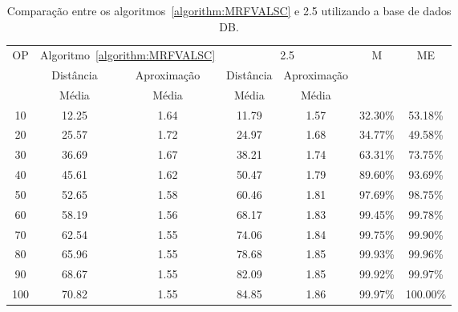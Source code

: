 \begin{table}[!htb]
  \caption{Comparação entre os algoritmos~\ref{algorithm:MRFVALSC} e 2.5\SbIRT{} utilizando a base de dados DB\textsubscript{\SbIRTM}.}
  \label{table:CFCQOBJI}
  \centering
  \begin{tabular}{|c|c|c|c|c|c|c|}
  \hline
          \multirow{3}{*}{OP} & \multicolumn{2}{c|}{Algoritmo~\ref{algorithm:MRFVALSC}} &  \multicolumn{2}{c|}{2.5\SbIRTM{}}  & \multirow{3}{*}{M} & \multirow{3}{*}{ME} \\ \cline{2-5}
                              &                     Distância &             Aproximação & Distância &             Aproximação &                    &                     \\
                              &                         Média &                   Média &     Média &                   Média &                    &                     \\ \hline
  10                          &                         12.25 &                    1.64 &     11.79 &                    1.57 &            32.30\% &             53.18\% \\ \hline
  20                          &                         25.57 &                    1.72 &     24.97 &                    1.68 &            34.77\% &             49.58\% \\ \hline
  30                          &                         36.69 &                    1.67 &     38.21 &                    1.74 &            63.31\% &             73.75\% \\ \hline
  40                          &                         45.61 &                    1.62 &     50.47 &                    1.79 &            89.60\% &             93.69\% \\ \hline
  50                          &                         52.65 &                    1.58 &     60.46 &                    1.81 &            97.69\% &             98.75\% \\ \hline
  60                          &                         58.19 &                    1.56 &     68.17 &                    1.83 &            99.45\% &             99.78\% \\ \hline
  70                          &                         62.54 &                    1.55 &     74.06 &                    1.84 &            99.75\% &             99.90\% \\ \hline
  80                          &                         65.96 &                    1.55 &     78.68 &                    1.85 &            99.93\% &             99.96\% \\ \hline
  90                          &                         68.67 &                    1.55 &     82.09 &                    1.85 &            99.92\% &             99.97\% \\ \hline
  100                         &                         70.82 &                    1.55 &     84.85 &                    1.86 &            99.97\% &            100.00\% \\ \hline
  \end{tabular}
\end{table}